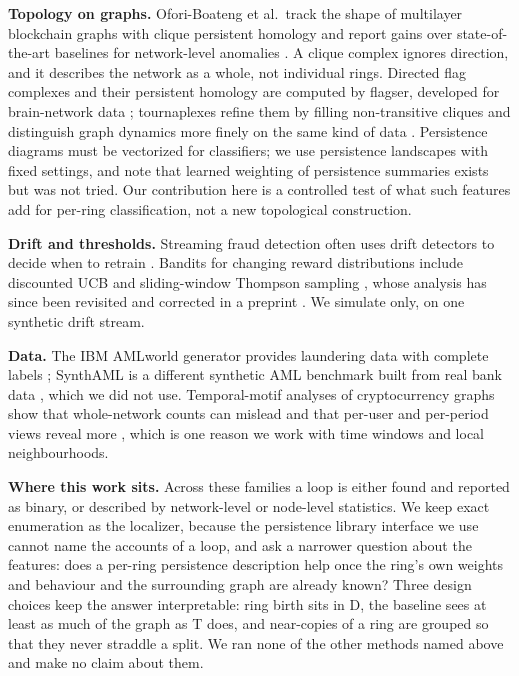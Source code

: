 \documentclass[conference]{IEEEtran}
\begin{document}
\textbf{Topology on graphs.} Ofori-Boateng et al.\ track the shape of multilayer blockchain graphs with clique persistent homology and report gains over state-of-the-art baselines for network-level anomalies \cite{ofori2021topological}. A clique complex ignores direction, and it describes the network as a whole, not individual rings. Directed flag complexes and their persistent homology are computed by flagser, developed for brain-network data \cite{lutgehetmann2020flagser}; tournaplexes refine them by filling non-transitive cliques and distinguish graph dynamics more finely on the same kind of data \cite{govc2021tournaplex}. Persistence diagrams must be vectorized for classifiers; we use persistence landscapes \cite{bubenik2015landscapes} with fixed settings, and note that learned weighting of persistence summaries exists \cite{zhao2019wkpi} but was not tried. Our contribution here is a controlled test of what such features add for per-ring classification, not a new topological construction.

\textbf{Drift and thresholds.} Streaming fraud detection often uses drift detectors to decide when to retrain \cite{vivek2025rosfd}. Bandits for changing reward distributions include discounted UCB \cite{garivier2011switching} and sliding-window Thompson sampling \cite{trovo2020swts}, whose analysis has since been revisited and corrected in a preprint \cite{fiandri2024swts}. We simulate only, on one synthetic drift stream.

\textbf{Data.} The IBM AMLworld generator provides laundering data with complete labels \cite{altman2023realistic}; SynthAML is a different synthetic AML benchmark built from real bank data \cite{jensen2023synthaml}, which we did not use. Temporal-motif analyses of cryptocurrency graphs show that whole-network counts can mislead and that per-user and per-period views reveal more \cite{arnold2024motifs}, which is one reason we work with time windows and local neighbourhoods.

\textbf{Where this work sits.} Across these families a loop is either found and reported as binary, or described by network-level or node-level statistics. We keep exact enumeration as the localizer, because the persistence library interface we use cannot name the accounts of a loop, and ask a narrower question about the features: does a per-ring persistence description help once the ring's own weights and behaviour and the surrounding graph are already known? Three design choices keep the answer interpretable: ring birth sits in D, the baseline sees at least as much of the graph as T does, and near-copies of a ring are grouped so that they never straddle a split. We ran none of the other methods named above and make no claim about them.
\end{document}
